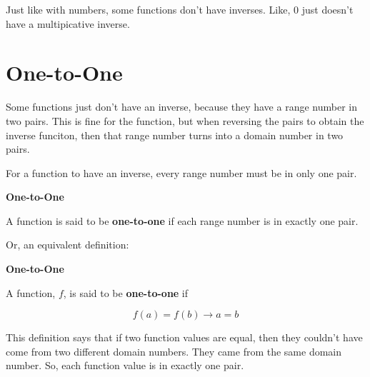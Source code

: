 \documentclass{ximera}
\begin{document}
Just like with numbers, some functions don't have inverses.  Like, $0$ just doesn't have a multipicative inverse.






\section{One-to-One}


Some functions just don't have an inverse, because they have a range number in two pairs.  This is fine for the function, but when reversing the pairs to obtain the inverse funciton, then that range number turns into a domain number in two pairs.


For a function to have an inverse, every range number must be in only one pair.



\begin{definition} \textbf{\textcolor{green!50!black}{One-to-One}}    


A function is said to be \textbf{one-to-one} if each range number is in exactly one pair.


\end{definition}



Or, an equivalent definition:

\begin{definition} \textbf{\textcolor{green!50!black}{One-to-One}}   


A function, $f$, is said to be \textbf{one-to-one} if 


\[    f(a) = f(b) \rightarrow a = b           \]


\end{definition}





This definition says that if two function values are equal, then they couldn't have come from two different domain numbers.  They came from the same domain number. So, each function value is in exactly one pair.
\end{document}
